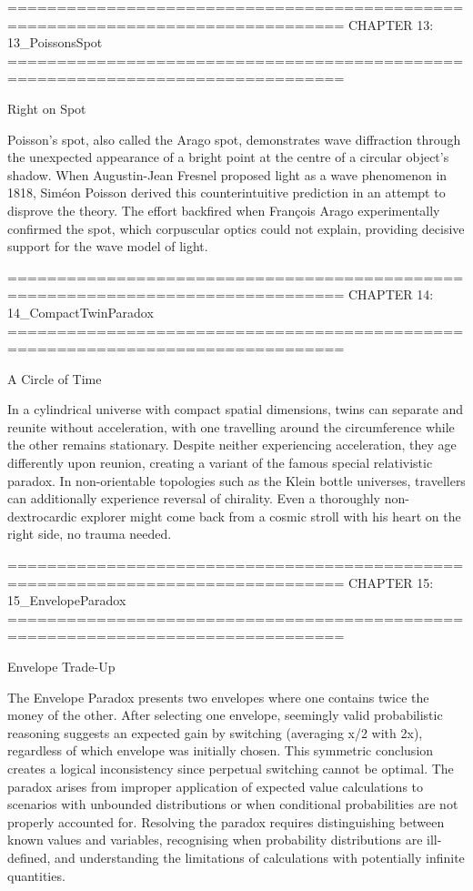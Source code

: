 ================================================================================
CHAPTER 13: 13_PoissonsSpot
================================================================================

Right on Spot

Poisson’s spot, also called the Arago spot, demonstrates wave diffraction through the unexpected appearance of a bright point at the centre of a circular object’s shadow. When Augustin-Jean Fresnel proposed light as a wave phenomenon in 1818, Siméon Poisson derived this counterintuitive prediction in an attempt to disprove the theory. The effort backfired when François Arago experimentally confirmed the spot, which corpuscular optics could not explain, providing decisive support for the wave model of light.


================================================================================
CHAPTER 14: 14_CompactTwinParadox
================================================================================

A Circle of Time

In a cylindrical universe with compact spatial dimensions, twins can separate and reunite without acceleration, with one travelling around the circumference while the other remains stationary. Despite neither experiencing acceleration, they age differently upon reunion, creating a variant of the famous special relativistic paradox. In non-orientable topologies such as the Klein bottle universes, travellers can additionally experience reversal of chirality. Even a thoroughly non-dextrocardic explorer might come back from a cosmic stroll with his heart on the right side, no trauma needed.


================================================================================
CHAPTER 15: 15_EnvelopeParadox
================================================================================

Envelope Trade-Up

The Envelope Paradox presents two envelopes where one contains twice the money of the other. After selecting one envelope, seemingly valid probabilistic reasoning suggests an expected gain by switching (averaging x/2 with 2x), regardless of which envelope was initially chosen. This symmetric conclusion creates a logical inconsistency since perpetual switching cannot be optimal. The paradox arises from improper application of expected value calculations to scenarios with unbounded distributions or when conditional probabilities are not properly accounted for. Resolving the paradox requires distinguishing between known values and variables, recognising when probability distributions are ill-defined, and understanding the limitations of calculations with potentially infinite quantities.


